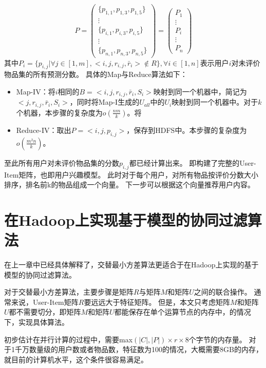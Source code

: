 \begin{equation}
P=\left(
\begin{array}{c}
 \{ p_{1,1},p_{1,3},p_{1,5} \} \\
\vdots \\
\{ p_{i,1},p_{i,3},p_{i,5} \} \\
\vdots \\
\{p_{n,1},p_{n,3},p_{n,5}\}
\end{array}
\right) = \left(
\begin{array}{c}
P_1 \\
\vdots\\
P_i\\
\vdots \\
P_n
\end{array}
\right)
\end{equation}
其中$P_i=\{p_{i,j}|\forall j\in [1,m],<i,j,r_{i,j},\bar{r}_i>\notin R\},\forall i\in[1,n]$表示用户$i$对未评价物品集的所有预测分数。
具体的Map与Reduce算法如下：
\begin{itemize}
\item Map-IV：将$i$相同的$B=<i,j,r_{i,j},\bar{r}_i ,S_i>$映射到同一个机器中，简记为$<j,r_{i,j},\bar{r}_i ,S_i>$，同时将Map-I生成的$U_{all}$中的$U_i$映射到同一个机器中。对于$k$个机器，本步骤的复杂度为$o(\frac{nm}{k})$。将
\item Reduce-IV：取出$P=<i,j,p_{i,j}>$，保存到HDFS中。本步骤的复杂度为$o(\frac{m^2n}{k})$。
\end{itemize}
至此所有用户对未评价物品集的分数$p_{i,j}$都已经计算出来。
即构建了完整的User-Item矩阵，也即用户兴趣模型。
此时对于每个用户，对所有物品按评价分数大小排序，排名前k的物品组成一个向量。
下一步可以根据这个向量推荐用户内容。

\section{在Hadoop上实现基于模型的协同过滤算法}
在上一章中已经具体解释了，交替最小方差算法更适合于在Hadoop上实现的基于模型的协同过滤算法。

对于交替最小方差算法，主要步骤是矩阵$R$与矩阵$M$和矩阵$U$之间的联合操作。
通常来说，User-Item矩阵$R$要远远大于特征矩阵。
但是，本文只考虑矩阵$M$和矩阵$U$都不需要切分，即矩阵$M$和矩阵$U$都能保存在单个运算节点的内存中，的情况下，实现具体算法。

初步估计在并行计算的过程中，需要max$(|C|,|P|)\times r \times 8$个字节的内存量。
对于1千万数量级的用户数或者物品数，特征数为100的情况，大概需要8GB的内存，就目前的计算机水平，这个条件很容易满足。

